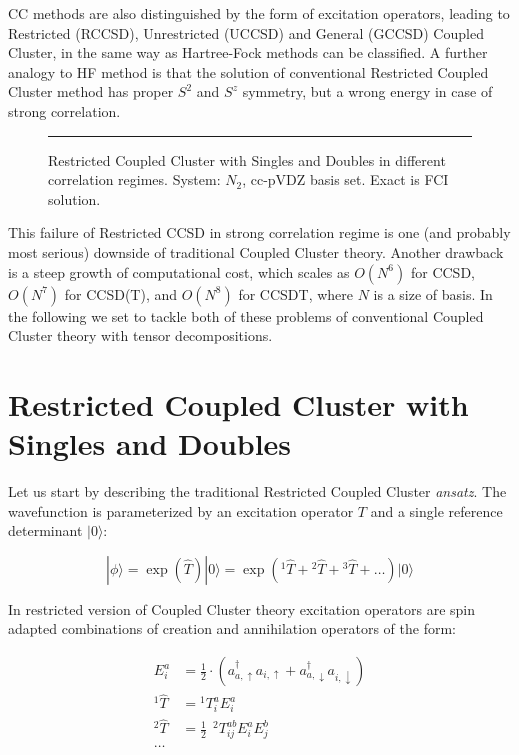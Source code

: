 CC methods are also distinguished by the form of excitation operators, 
leading to Restricted (RCCSD),\cite{scuseria_ccsd} Unrestricted (UCCSD) and 
General (GCCSD) Coupled Cluster, in the same way as Hartree-Fock methods can be 
classified. A further analogy to HF method is that the solution of conventional 
Restricted Coupled Cluster method has proper $S^{2}$ and $S^{z}$ symmetry, but a 
wrong energy in case of strong correlation.

\begin{figure}[!ht]
\centering
 \rule{0.8\textwidth}{2cm}
 \caption{Restricted Coupled Cluster with Singles and Doubles in different 
correlation regimes. System: $N_{2}$, cc-pVDZ basis set. Exact is FCI solution.}
\end{figure}

This failure of Restricted CCSD in strong correlation regime is one (and 
probably most serious) downside of traditional Coupled Cluster theory. Another 
drawback is a steep growth of computational cost,\cite{noga1987full, 
scuseria1989coupled} which scales as $O(N^6)$ for CCSD, $O(N^7)$ for CCSD(T), 
and $O(N^8)$ for CCSDT, where $N$ is a size of basis. In the following we set 
to tackle both of these problems of conventional Coupled Cluster theory with 
tensor decompositions.

\section{Restricted Coupled Cluster with Singles and Doubles}
Let us start by describing the traditional Restricted Coupled Cluster 
\emph{ansatz}.\cite{bartlett2007coupled} The wavefunction is 
parameterized by an excitation operator $T$ and a single reference 
determinant $| 0 \rangle$:

\begin{equation}
 | \phi \rangle  = \exp(\hat{T}) | 0 \rangle = \exp({}^1\hat{T} + {}^2\hat{T} + 
{}^3\hat{T} + \ldots) | 0 \rangle
\end{equation}

In restricted version of Coupled Cluster theory excitation operators are spin 
adapted combinations of creation and annihilation operators of the form:

\begin{equation}
\begin{split}
 E_{i}^{a} & = \frac{1}{2} \cdot (a_{a, \uparrow}^{\dagger} a_{i, \uparrow} + 
a_{a, \downarrow}^{\dagger} a_{i, \downarrow}) \\
 {}^{1}\hat{T} & = {}^{1}T_{i}^{a} E_{i}^{a} \\
 {}^{2}\hat{T} & = \frac{1}{2} ~~ {}^{2}T_{ij}^{ab} E_{i}^{a} E_{j}^{b} \\
 \ldots
\end{split}
\end{equation}

